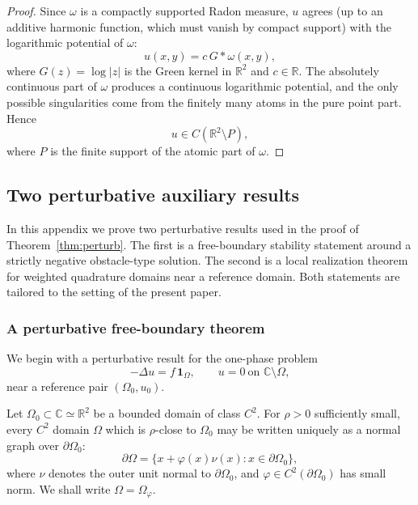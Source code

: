 \documentclass[a4paper,11pt,reqno]{amsart}
\numberwithin{equation}{section}
\theoremstyle{plain} %
\theoremstyle{definition} %
\theoremstyle{remark}
\newcommand{\R}{\mathbb{R}}
\newcommand{\C}{\mathbb{C}}
\begin{document}
\begin{proof}
Since $\omega$ is a compactly supported Radon measure, $u$ agrees (up to an additive harmonic function, which must vanish by compact support) with the logarithmic potential of $\omega$:
\[
u(x,y)=c\, G*\omega(x,y),
\]
where $G(z)=\log|z|$ is the Green kernel in $\R^2$ and $c\in\R$. The absolutely continuous part of $\omega$ produces a continuous logarithmic potential, and the only possible singularities come from the finitely many atoms in the pure point part. Hence
\[
u\in C(\R^2\setminus P),
\]
where $P$ is the finite support of the atomic part of $\omega$.
\end{proof}

\subsection{Two perturbative auxiliary results}\label{app:auxiliary-results}

In this appendix we prove two perturbative results used in the proof of
Theorem~\ref{thm:perturb}. The first is a free-boundary stability
statement around a strictly negative obstacle-type solution. The second is a
local realization theorem for weighted quadrature domains near a reference
domain. Both statements are tailored to the setting of the present paper.

\subsubsection{A perturbative free-boundary theorem}\label{app:isakov-type}

We begin with a perturbative result for the one-phase problem
\[
-\Delta u = f\,\mathbf{1}_{\Omega},
\qquad
u=0 \ \text{on } \C\setminus \Omega,
\]
near a reference pair \((\Omega_0,u_0)\).

Let \(\Omega_0\subset \C\simeq \R^2\) be a bounded domain of class \(C^2\). For
\(\rho>0\) sufficiently small, every \(C^2\) domain \(\Omega\) which is
\(\rho\)-close to \(\Omega_0\) may be written uniquely as a normal graph over
\(\partial\Omega_0\):
\[
\partial\Omega
=
\{x+\varphi(x)\nu(x):x\in \partial\Omega_0\},
\]
where \(\nu\) denotes the outer unit normal to \(\partial\Omega_0\), and
\(\varphi\in C^2(\partial\Omega_0)\) has small norm. We shall write
\(\Omega=\Omega_\varphi\).
\end{document}
